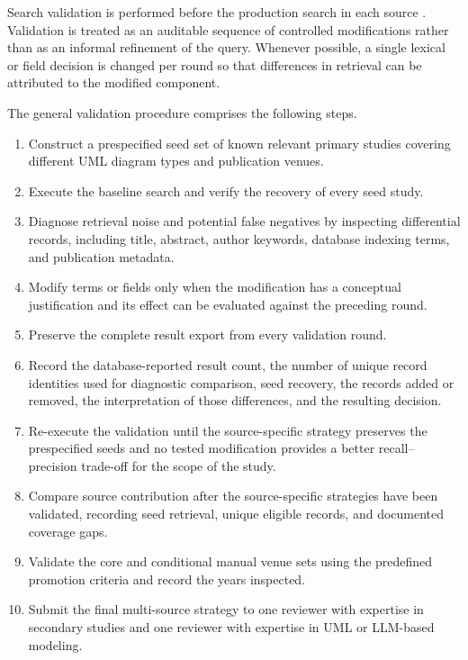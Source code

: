 Search validation is performed before the production search in each source
\cite{Zhang2011Identifying}. Validation is treated as an auditable sequence of
controlled modifications rather than as an informal refinement of the query.
Whenever possible, a single lexical or field decision is changed per round so
that differences in retrieval can be attributed to the modified component.

The general validation procedure comprises the following steps.

\begin{enumerate}[label=\arabic*)]
    \item Construct a prespecified seed set of known relevant primary studies
    covering different UML diagram types and publication venues.
    \item Execute the baseline search and verify the recovery of every seed study.
    \item Diagnose retrieval noise and potential false negatives by inspecting
    differential records, including title, abstract, author keywords, database
    indexing terms, and publication metadata.
    \item Modify terms or fields only when the modification has a conceptual
    justification and its effect can be evaluated against the preceding round.
    \item Preserve the complete result export from every validation round.
    \item Record the database-reported result count, the number of unique record
    identities used for diagnostic comparison, seed recovery, the records added
    or removed, the interpretation of those differences, and the resulting decision.
    \item Re-execute the validation until the source-specific strategy preserves
    the prespecified seeds and no tested modification provides a better
    recall--precision trade-off for the scope of the study.
    \item Compare source contribution after the source-specific strategies have
    been validated, recording seed retrieval, unique eligible records, and
    documented coverage gaps.
    \item Validate the core and conditional manual venue sets using the predefined
    promotion criteria and record the years inspected.
    \item Submit the final multi-source strategy to one reviewer with expertise
    in secondary studies and one reviewer with expertise in UML or LLM-based modeling.
\end{enumerate}

